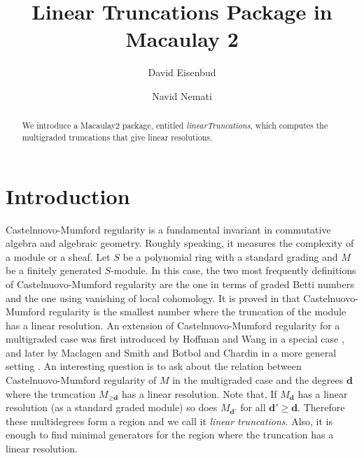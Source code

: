 \documentclass[11pt]{amsart}
\theoremstyle{definition}
\begin{document}
\title[LinearTruncations.m2]{Linear Truncations Package in Macaulay 2} 
\author{David Eisenbud}
\address{Department of Mathematics, University of California at Berkeley and the Mathematical Sciences Research Institute, Berkeley, CA 94720, USA}
\author{Navid Nemati}
\address{Institut de Math\'{e}matiques de Jussieu, Sorbonne Universit\'{e}, 4 Place de Jussieu, 75005 Paris, France}


\begin{abstract}
 We introduce a  Macaulay2 package, entitled \textit{linearTruncations}, which computes the multigraded truncations that give linear resolutions.
\end{abstract}

\maketitle
\section{Introduction}

\noindent Castelnuovo-Mumford regularity is a fundamental invariant in commutative algebra and algebraic geometry. Roughly speaking, it measures the complexity of a module or a sheaf. Let $S$ be a polynomial ring with a standard grading and $M$ be a finitely generated $S$-module. In this case, the two most frequently definitions of Castelnuovo-Mumford regularity are the one in terms of graded Betti numbers and the one using vanishing of local cohomology. It is proved in \cite{EisenbudGoto} that Castelnuovo-Mumford regularity is the smallest number where the truncation of the module has a linear resolution. An extension of Castelnuovo-Mumford regularity for a multigraded case was first introduced by Hoffman and Wang in a special case \cite{HoffmanWang}, and later by Maclagen and Smith \cite{MaclagenSmith} and Botbol and Chardin in a more general setting \cite{BotbolChardin}. An interesting question is to ask about the relation between Castelnuovo-Mumford regularity of $M$ in the multigraded case and the degrees $\textbf{d}$ where the truncation $M_{\geq \textbf{d}}$ has a linear resolution.  Note that, If $M_{\textbf{d}}$ has a linear resolution (as a standard graded module) so does $M_{\textbf{d}'}$  for all $\textbf{d}'\geq \textbf{d}$. Therefore these multidegrees form a region and we call it \textit{linear truncations}. Also, it is enough to find  minimal generators for the region where the truncation has a linear resolution.
\end{document}
